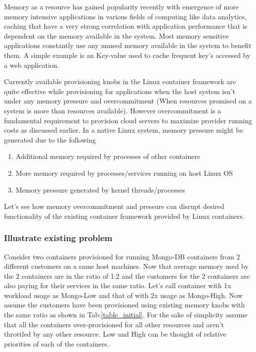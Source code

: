       Memory as a resource has gained popularity recently with emergence of more memory intensive applications in various fields of 
computing like data analytics, caching that have a very strong correlation with application performance that is dependent on the memory 
available in the system. Most memory sensitive applications constantly use any unused memory available in the system to benefit them. A 
simple example is an Key-value used to cache frequent key's accessed by a web application. 

      Currently available provisioning knobs in the Linux container framework are quite effective while provisioning for applications when 
the host system isn't under any memory pressure and overcommitment (When resources promised on a system is more than resources available). 
However overcommitment is a fundamental requirement to provision cloud servers to maximize provider running costs as discussed earlier. In a 
native Linux system, memory pressure might be generated due to the following 

      \begin{enumerate}
	\item Additional memory required by processes of other containers
	\item More memory required by processes/services running on host Linux OS
	\item Memory pressure generated by kernel threads/processes
      \end{enumerate}
      
      Let's see how memory overcommitment and pressure can disrupt desired functionality of the existing container framework provided by 
Linux containers.
    
      \subsubsection{Illustrate existing problem}
	
	Consider two containers provisioned for running Mongo-DB containers from 2 different customers on a same host machines. Now that 
average memory used by the 2 containers are in the ratio of 1:2 and the customers for the 2 containers are also paying for their services in 
the same ratio. Let's call container with 1x workload usage as Mongo-Low and that of with 2x usage as Mongo-High. Now assume the customers 
have been provisioned using existing memory knobs with the same ratio as shown in Tab:\ref{table_initial}. For the sake of simplicity assume 
that all the containers over-provisioned for all other resources and aren't throttled by any other resource. Low and High can be thought of 
relative priorities of each of the containers.
	
